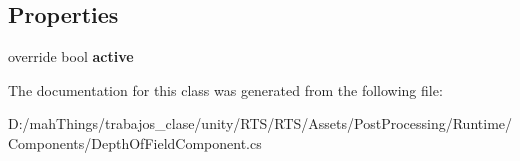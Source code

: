 \subsection*{Properties}
\begin{DoxyCompactItemize}
\item 
\mbox{\label{class_unity_engine_1_1_post_processing_1_1_depth_of_field_component_a8df687892189d109e533c6a4320eca73}} 
override bool {\bfseries active}
\end{DoxyCompactItemize}


The documentation for this class was generated from the following file\+:\begin{DoxyCompactItemize}
\item 
D\+:/mah\+Things/trabajos\+\_\+clase/unity/\+R\+T\+S/\+R\+T\+S/\+Assets/\+Post\+Processing/\+Runtime/\+Components/Depth\+Of\+Field\+Component.\+cs\end{DoxyCompactItemize}
